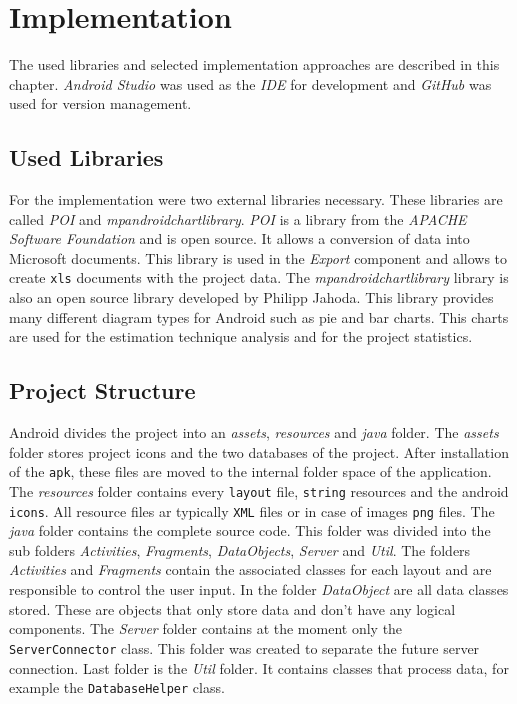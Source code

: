 \chapter{Implementation}

The used libraries and selected implementation approaches are described in this chapter. \textit{Android Studio} was used as the \textit{IDE} for development and \textit{GitHub} was used for version management. 

\section{Used Libraries}

For the implementation were two external libraries necessary. These libraries are called \textit{POI} and \textit{mpandroidchartlibrary}. \textit{POI} is a library from the \textit{APACHE Software Foundation} and is open source. It allows a conversion of data into Microsoft documents. This library is used
in the \textit{Export} component and allows to create \texttt{xls} documents with the project data. The \textit{mpandroidchartlibrary} library is also an open source library developed by Philipp Jahoda. This library provides many different diagram types for Android such as pie and bar charts. This charts are used for the estimation technique analysis and for the project statistics. 

\section{Project Structure}

Android divides the project into an \textit{assets}, \textit{resources} and \textit{java} folder. The \textit{assets} folder stores project icons and the two databases of the project. After installation of the \texttt{apk}, these files are moved to the internal folder space of the application. The \textit{resources} folder contains every \texttt{layout} file, \texttt{string} resources and the android \texttt{icons}. All resource files ar typically \texttt{XML} files or in case of images \texttt{png} files. The \textit{java} folder contains the complete source code. This folder was divided into the sub folders \textit{Activities}, \textit{Fragments}, \textit{DataObjects}, \textit{Server} and \textit{Util}. The folders \textit{Activities} and \textit{Fragments} contain the associated classes for each layout and are responsible to control the user input. In the folder \textit{DataObject} are all data classes stored. These are objects that only store data and don't have any logical components. The \textit{Server} folder contains at the moment only the \texttt{ServerConnector} class. This folder was created to separate the future server connection. Last folder is the \textit{Util} folder. It contains classes that process data, for example the \texttt{DatabaseHelper} class.

